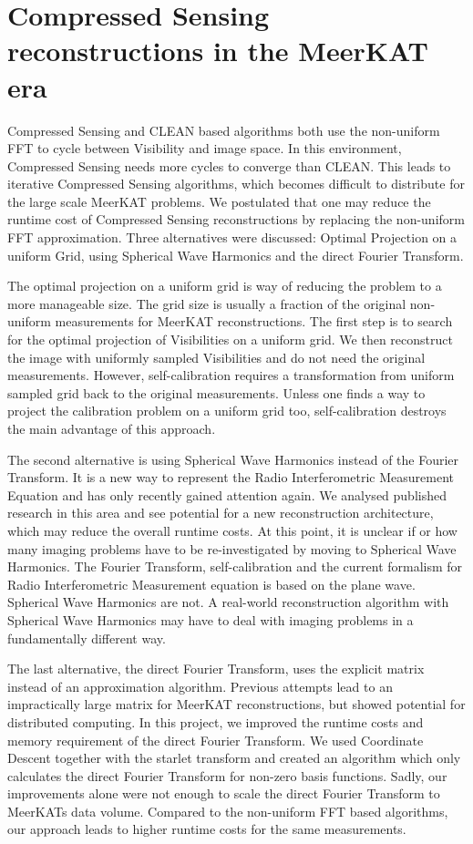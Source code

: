 \section{Compressed Sensing reconstructions in the MeerKAT era}
Compressed Sensing and CLEAN based algorithms both use the non-uniform FFT to cycle between Visibility and image space. In this environment, Compressed Sensing needs more cycles to converge than CLEAN. This leads to iterative Compressed Sensing algorithms, which becomes difficult to distribute for the large scale MeerKAT problems. We postulated that one may reduce the runtime cost of Compressed Sensing reconstructions by replacing the non-uniform FFT approximation. Three alternatives were discussed: Optimal Projection on a uniform Grid, using Spherical Wave Harmonics and the direct Fourier Transform.

The optimal projection on a uniform grid is way of reducing the problem to a more manageable size. The grid size is usually a fraction of the original non-uniform measurements for MeerKAT reconstructions. The first step is to search for the optimal projection of Visibilities on a uniform grid. We then reconstruct the image with uniformly sampled Visibilities and do not need the original measurements. However, self-calibration requires a transformation from uniform sampled grid back to the original measurements. Unless one finds a way to project the calibration problem on a uniform grid too, self-calibration destroys the main advantage of this approach.

The second alternative is using Spherical Wave Harmonics instead of the Fourier Transform. It is a new way to represent the Radio Interferometric Measurement Equation and has only recently gained attention again. We analysed published research in this area\cite{carozzi2015imaging, mcewen2008simulating} and see potential for a new reconstruction architecture, which may reduce the overall runtime costs. At this point, it is unclear if or how many imaging problems have to be re-investigated by moving to Spherical Wave Harmonics. The Fourier Transform, self-calibration and the current formalism for Radio Interferometric Measurement equation is based on the plane wave\cite{smirnov2011revisiting}. Spherical Wave Harmonics are not. A real-world reconstruction algorithm with Spherical Wave Harmonics may have to deal with imaging problems in a fundamentally different way.

The last alternative, the direct Fourier Transform, uses the explicit matrix instead of an approximation algorithm. Previous attempts\cite{hardy2013direct} lead to an impractically large matrix for MeerKAT reconstructions, but showed potential for distributed computing. In this project, we improved the runtime costs and memory requirement of the direct Fourier Transform. We used Coordinate Descent together with the starlet transform and created an algorithm which only calculates the direct Fourier Transform for non-zero basis functions. Sadly, our improvements alone were not enough to scale the direct Fourier Transform to MeerKATs data volume. Compared to the non-uniform FFT based algorithms, our approach leads to higher runtime costs for the same measurements. 

